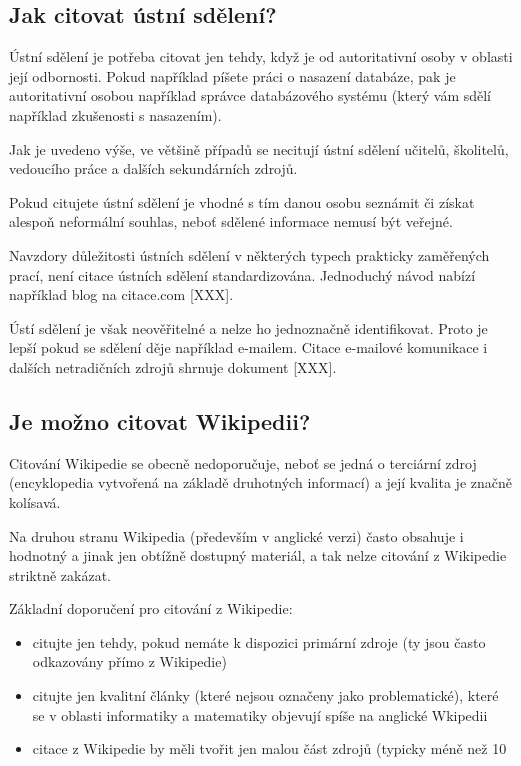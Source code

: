 \documentclass[male,czech,api_bc]{kitheses}
\begin{document}
\subsection{Jak citovat ústní sdělení?}

Ústní sdělení je potřeba citovat jen tehdy, když je od autoritativní osoby v oblasti její odbornosti. Pokud například píšete práci o nasazení databáze, pak je autoritativní osobou například
správce databázového systému (který vám sdělí například zkušenosti s nasazením).

Jak je uvedeno výše, ve většině případů se necitují ústní sdělení učitelů, školitelů, vedoucího práce a dalších sekundárních zdrojů.

Pokud citujete ústní sdělení je vhodné s tím danou osobu seznámit či získat alespoň neformální souhlas, neboť sdělené informace nemusí být veřejné.

Navzdory důležitosti ústních sdělení v některých typech prakticky zaměřených prací, není citace ústních sdělení standardizována. Jednoduchý návod nabízí například blog na citace.com [XXX].

Ústí sdělení je však neověřitelné a nelze ho jednoznačně identifikovat. Proto je lepší pokud se sdělení děje například e-mailem. Citace e-mailové komunikace i dalších netradičních zdrojů shrnuje
dokument [XXX].

\subsection{Je možno citovat Wikipedii?}

Citování Wikipedie se obecně nedoporučuje, neboť se jedná o terciární zdroj (encyklopedia vytvořená na základě druhotných informací) a její kvalita je značně kolísavá.

Na druhou stranu Wikipedia (především v anglické verzi) často obsahuje i hodnotný a jinak jen obtížně dostupný materiál, a tak nelze citování z Wikipedie striktně zakázat.

Základní doporučení pro citování z Wikipedie:

\begin{itemize}
\item citujte jen tehdy, pokud nemáte k dispozici primární zdroje (ty jsou často odkazovány přímo
z Wikipedie)
\item  citujte jen kvalitní články (které nejsou označeny jako problematické), které se v oblasti
informatiky a matematiky objevují spíše na anglické Wkipedii
\item citace z Wikipedie by měli tvořit jen malou část zdrojů (typicky méně než 10%
\end{itemize}
\end{document}

